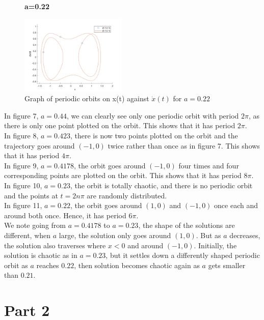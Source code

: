 \documentclass[10pt]{article}
\begin{document}
\begin{figure}[H]
\centering
\textbf{a=0.22}\par
\includegraphics[width=0.45\textwidth]{Files/q5,a=0.22.png}
\caption{Graph of periodic orbits on x(t) against $\dot{x}(t)$ for $a=0.22$}
\end{figure}
\noindent In figure 7, $a=0.44$, we can clearly see only one periodic orbit with period $2\pi$, as there is only one point plotted on the orbit. This shows that it has period $2\pi$.\\
In figure 8, $a=0.423$, there is now two points plotted on the orbit and the trajectory goes around $(-1,0)$ twice rather than once as in figure 7. This shows that it has period $4\pi$.\\
In figure 9, $a=0.4178$, the orbit goes around $(-1,0)$ four times and four corresponding points are plotted on the orbit. This shows that it has period $8\pi$.\\
In figure 10, $a=0.23$, the orbit is totally chaotic, and there is no periodic orbit and the points at $t=2n\pi$ are randomly distributed.\\
In figure 11, $a=0.22$, the orbit goes around $(1,0)$ and $(-1,0)$ once each and around both once. Hence, it has period $6\pi$.\\
We note going from $a=0.4178$ to $a=0.23$, the shape of the solutions are different, when $a$ large, the solution only goes around $(1,0)$. But as $a$ decreases, the solution also traverses where $x<0$ and around $(-1,0)$. Initially, the solution is chaotic as in $a=0.23$, but it settles down a differently shaped periodic orbit as $a$ reaches $0.22$, then solution becomes chaotic again as $a$ gets smaller than $0.21$.

\newpage
\section*{Part 2}
\end{document}
